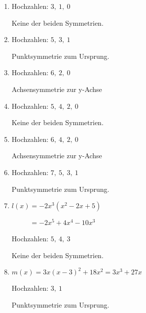\begin{Answer}[ref=ganzSymA1]

	\begin{minipage}{\textwidth}
		\begin{minipage}[t]{0.5\textwidth}
			\begin{enumerate}[label=\alph*)]
				\item Hochzahlen: \(3,\ 1,\ 0\)

				Keine der beiden Symmetrien.
				\item Hochzahlen: \(5,\ 3,\ 1\)

				Punktsymmetrie zum Ursprung.
				\item Hochzahlen: \(6,\ 2,\ 0\)

				Achsensymmetrie zur y-Achse
				\item Hochzahlen: \(5,\ 4,\ 2,\ 0\)

				Keine der beiden Symmetrien.
			\end{enumerate}
		\end{minipage}%
		\begin{minipage}[t]{0.5\textwidth}
			\begin{enumerate}[label=\alph*)]
				\setcounter{enumi}{4}
				\item Hochzahlen: \(6,\ 4,\ 2,\ 0\)

				Achsensymmetrie zur y-Achse
				\item Hochzahlen: \(7,\ 5,\ 3,\ 1\)

				Punktsymmetrie zum Ursprung.
				\item \(l(x)=-2x^3\left(x^2-2x+5\right)\)

				\(\phantom{l(x)}=-2x^5+4x^4-10x^3\)

				Hochzahlen: \(5,\ 4,\ 3\)

				Keine der beiden Symmetrien.
				\item \(m(x)=3x\left(x-3\right)^2+18x^2=3x^3+27x\)

				Hochzahlen: \(3,\ 1\)

				Punktsymmetrie zum Ursprung.
			\end{enumerate}
		\end{minipage}%
	\end{minipage}
\end{Answer}